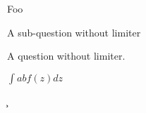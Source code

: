 \documentclass{article}
\begin{document}
\question


\subquestion

Foo

\subquestionnobar

A sub-question without limiter


\questionnobar

A question without limiter.






$\int{a}{b}f(z)dz$

\do


\dpi


\c{}


\ux

\ex

 \w
\end{document}

